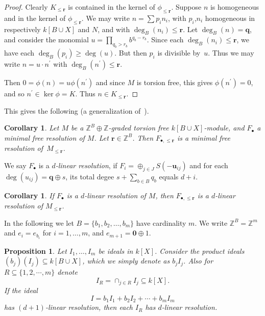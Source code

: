 \documentclass[10pt,a4paper]{article}
\newtheorem{prop}[cdrthm]{Proposition}
\newtheorem{coro}[cdrthm]{Corollary}
\theoremstyle{definition}
\theoremstyle{remark}
\theoremstyle{plain}
\newcommand{\sus}{\subseteq}
\newcommand{\ZZ}{{\mathbb Z}}
\newcommand{\bfr}{{\mathbf r}}
\newcommand{\bfq}{{\mathbf q}}
\begin{document}
\begin{proof} Clearly $K_{\leq \bfr}$ is contained in the kernel of
  $\phi_{\leq \bfr}$. 
  Suppose $n$ is homogeneous and
  in the kernel of $\phi_{\leq \bfr}$. We may write 
  $n = \sum p_i n_i$, with $p_i$,$n_i$ homogeneous in respectively $k[B \cup X]$ and $N$,
  and with $\deg_B(n_i) \leq \bfr$. Let $\deg_B(n) = \bfq$, 
  and consider the monomial
  $u = \prod_{q_b > r_b}b^{q_b - r_b}$. Since each $\deg_B(n_i) \leq \bfr$,
  we have each $\deg_B(p_i) \geq \deg(u)$. But then $p_i$ is
  divisible by~$u$. Thus we may write $n = u \cdot n^\prime$
  with $\deg_B(n^\prime) \leq \bfr$. 

  Then $0 = \phi(n) = u \phi(n^\prime)$ and since $M$ is torsion
  free, this gives $\phi(n^\prime) = 0$, and so $n^\prime \in \ker \phi = K$.
  Thus  $n \in K_{\leq \bfr}$.
\end{proof}

This gives the following (a generalization of~\cite[Thm.~2.1]{GaHiPe}).

\begin{coro}
  Let $M$ be a $\ZZ^B \oplus \ZZ$-graded torsion free $k[B \cup X]$-module,
  and $F_\bullet$ a minimal free resolution of $M$. Let $\bfr \in \ZZ^B$.
  Then $F_{\bullet, \leq \bfr}$ is a minimal free resolution of~$M_{\leq \bfr}$.
\end{coro}

We say $F_{\bullet}$ is a {\it $d$-linear resolution}, if
$F_i = \oplus_{j \in J} S(-{\mathbf u}_{ij})$ and for each
$\deg(u_{ij}) = \bfq \oplus s$, its total degee $s + \sum_{b \in B} q_b$
equals $d + i$.

\begin{coro} \label{cor:lin-Frlin}
  If $F_{\bullet}$ is a $d$-linear resolution of $M$, then
  $F_{\bullet, \leq \bfr}$ is a $d$-linear resolution of $M_{\leq \bfr}$.
\end{coro}

In the following we let $B = \{b_1, b_2, \ldots, b_m\}$ have
cardinality $m$. We write $\ZZ^B = \ZZ^m$ and $e_i = e_{b_i}$ for
$i = 1, \ldots, m$, and $e_{m+1} = {\mathbf 0} \oplus 1$.

\begin{prop} \label{pro:lin-ItoIR}
  Let $I_1, \ldots, I_m$ be ideals in $k[X]$.
Consider the product ideals $(b_j) (I_j) \sus k[B \cup X]$, which
we simply denote as $b_j I_j$. Also for $R \sus \{1,2, \cdots, m\}$
denote
\[ I_R = \cap_{j \in R} I_j  \sus k[X]. \]
If the ideal
\[ I = b_1 I_1 + b_2 I_2 + \cdots + b_m I_m \]
has $(d+1)$-linear resolution, then each $I_R$ has $d$-linear resolution.
\end{prop}
\end{document}
